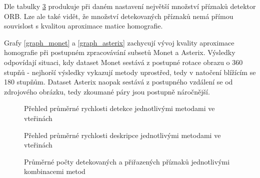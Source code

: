 Dle tabulky \ref{match_count} produkuje při daném nastavení největší množství příznaků detektor ORB. Lze ale také vidět, že množství
detekovaných příznaků nemá přímou souvislost s kvalitou aproximace matice homografie.

Grafy \ref{graph_monet} a \ref{graph_asterix} zachycují vývoj kvality aproximace homografie při postupném zpracovávání subsetů Monet a Asterix.
Výsledky odpovídají situaci, kdy dataset Monet sestává z postupné rotace obrazu o 360 stupňů - nejhorší výsledky vykazují metody uprostřed, tedy
v natočení blížícím se 180 stupňům. Dataset Asterix naopak sestává z postupného vzdálení se od zdrojového obrázku, tedy zkoumané páry jsou postupně
náročnější.

\begin{figure}[htp] 
	\caption{Přehled průměrné rychlosti detekce jednotlivými metodami ve vteřinách} \label{det_times}
\end{figure}

\begin{figure}[htp] 
	\caption{Přehled průměrné rychlosti deskripce jednotlivými metodami ve vteřinách} \label{desc_times}
\end{figure}

\begin{figure}[htp] 
	\caption{Průměrné počty detekovaných a přiřazených příznaků jednotlivými kombinacemi metod}	\label{match_count}
\end{figure}


